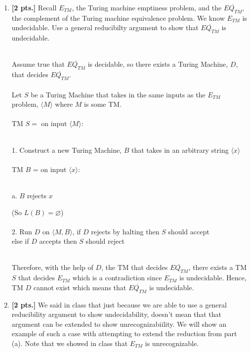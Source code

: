\documentclass[11pt]{article}
\theoremstyle{definition}
\theoremstyle{theorem}
\newcommand{\solution}{\medskip\noindent{\color{blue}\textbf{Solution:}}}
\begin{document}
\begin{enumerate}[label=(\alph*)]

\item \textbf{[2 pts.]} Recall $E_{TM}$, the Turing machine emptiness problem, and the $\overline{EQ_{TM}}$, the complement of the Turing machine equivalence problem. We know $E_{TM}$ is undecidable. Use a general reducibilty argument to show that $\overline{EQ_{TM}}$ is undecidable.

\solution \\
Assume true that $\overline{EQ_{TM}}$ is decidable, so there exists a Turing Machine, $D$, that decides $\overline{EQ_{TM}}$. \\~\\
Let $S$ be a Turing Machine that takes in the same inputs as the $E_{TM}$ problem, $\langle M\rangle$ where $M$ is some TM. \\~\\
TM $S =$ on input $\langle M \rangle$: \\~\\
\hspace*{0.54cm}
\begin{minipage}{0.9\textwidth}
	1. Construct a new Turing Machine, $B$ that takes in an arbitrary string $\langle x \rangle$\\~\\
	TM $B$ = on input $\langle x \rangle$: \\~\\
	\hspace*{0.9cm}
	\begin{minipage}{1.2\textwidth}
		a. $B$ rejects $x$\\
	\end{minipage}
	(So $L(B) = \varnothing$) \\~\\
	2. Run $D$ on $\langle M, B \rangle$, if $D$ rejects by halting then $S$ should accept \\
	else if $D$ accepts then $S$ should reject\\~\\
\end{minipage}

Therefore, with the help of $D$, the TM that decides $\overline{EQ_{TM}}$, there exists a TM $S$ that decides $E_{TM}$ which is a contradiction since $E_{TM}$ is undecidable. Hence, TM $D$ cannot exist which means that $\overline{EQ_{TM}}$ is undecidable.



\item \textbf{[2 pts.]}  We said in class that just because we are able to use a general reducibility argument to show undecidability, doesn't mean that that argument can be extended to show unrecognizabiility. We will show an example of such a case with attempting to extend the reduction from part (a). Note that we showed in class that $E_{TM}$ is unrecognizable. 


\end{enumerate}
\end{document}
